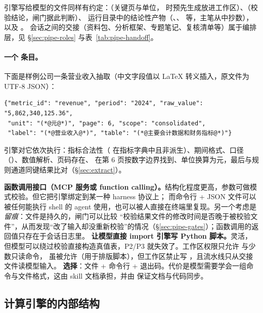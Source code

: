 引擎写给模型的文件同样有约定：（关键页与单位， 时预先生成放进工作区）、（校验结论，闸门据此判断）、
运行目录中的结论性产物（、、 等，主笔从中抄数），以及 。
会话之间的交接（资料包、分析框架、专题笔记、复核清单等）属于编排层，见 \S\ref{sec:pipe-roles} 与表~\ref{tab:pipe-handoff}。

\paragraph{一个  条目。}下面是样例公司一条营业收入抽取（中文字段值以 LaTeX 转义插入，原文件为 UTF-8 JSON）：

\begin{lstlisting}
{"metric_id": "revenue", "period": "2024", "raw_value": "5,862,340,125.36",
 "unit": "(*@元@*)", "page": 6, "scope": "consolidated",
 "label": "(*@营业收入@*)", "table": "(*@主要会计数据和财务指标@*)"}
\end{lstlisting}

引擎对它依次执行：指标合法性（ 在指标字典中且非派生）、期间格式、口径（）、数值解析、页码存在、
 在第 6 页按数字边界找到、单位换算为元，最后与规则通道同键结果比对（\S\ref{sec:extract}）。

\begin{tradeoff}[：接口形式]
\textbf{函数调用接口（MCP 服务或 function calling）。}结构化程度更高，参数可做模式校验。但它把引擎绑定到某一种 harness 协议上；
而命令行 + JSON 文件可以被任何能执行 shell 的 agent 使用，也可以被人直接在终端里复现。另一个考虑是\emph{留痕}：文件是持久的，闸门可以比较
“校验结果文件的修改时间是否晚于被校验文件”，从而发现“改了输入却没重新校验”的情况（\S\ref{sec:pipe-gates}）；函数调用的返回值只存在于会话日志里。
\textbf{让模型直接 import 引擎写 Python 脚本。}灵活，但模型可以绕过校验直接构造真值表，P2/P3 就失效了。工作区权限只允许  与少数只读命令，
 虽被允许（用于排版脚本），但工作区禁止写 ，且流水线只从交接文件读模型输入。
\textbf{选择}：文件 + 命令行 + 退出码。代价是模型需要学会一组命令与文件格式，这由 skill 文档承担，并由  保证文档与代码同步。
\end{tradeoff}

\subsection{计算引擎的内部结构}
\label{sec:arch-engine}

